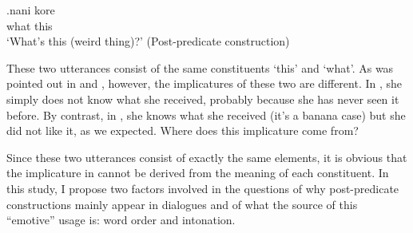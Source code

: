 \exg.\label{nanikore}nani kore \\
	what this \\
	`What's this (weird thing)?'
	\hfill{(Post-predicate construction)}

These two utterances consist of the same constituents  `this' and  `what'.
As was pointed out in  and ,
however, the implicatures of these two are different.
In \LLast,
she simply does not know what she received,
probably because she has never seen it before.
By contrast, in \Last,
she knows what she received (it's a banana case) but she did not like it, as we expected.
Where does this implicature come from?

Since these two utterances consist of exactly the same elements,
it is obvious that the implicature in \Last cannot be derived from the meaning of each constituent.
In this study, I propose two factors involved in the questions of why post-predicate constructions mainly appear in dialogues and of what the source of this ``emotive'' usage is:
word order and intonation.

